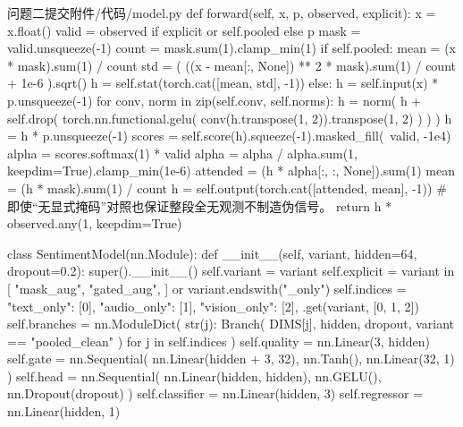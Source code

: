 \begin{appendices}
\begin{Python}{问题二提交附件/代码/model.py}
    def forward(self, x, p, observed, explicit):
        x = x.float()
        valid = observed if explicit or self.pooled else p
        mask = valid.unsqueeze(-1)
        count = mask.sum(1).clamp_min(1)
        if self.pooled:
            mean = (x * mask).sum(1) / count
            std = (
                ((x - mean[:, None]) ** 2 * mask).sum(1) / count + 1e-6
            ).sqrt()
            h = self.stat(torch.cat([mean, std], -1))
        else:
            h = self.input(x) * p.unsqueeze(-1)
            for conv, norm in zip(self.conv, self.norms):
                h = norm(
                    h
                    + self.drop(
                        torch.nn.functional.gelu(
                            conv(h.transpose(1, 2)).transpose(1, 2)
                        )
                    )
                )
                h = h * p.unsqueeze(-1)
            scores = self.score(h).squeeze(-1).masked_fill(~valid, -1e4)
            alpha = scores.softmax(1) * valid
            alpha = alpha / alpha.sum(1, keepdim=True).clamp_min(1e-6)
            attended = (h * alpha[:, :, None]).sum(1)
            mean = (h * mask).sum(1) / count
            h = self.output(torch.cat([attended, mean], -1))
        # 即使“无显式掩码”对照也保证整段全无观测不制造伪信号。
        return h * observed.any(1, keepdim=True)


class SentimentModel(nn.Module):
    def __init__(self, variant, hidden=64, dropout=0.2):
        super().__init__()
        self.variant = variant
        self.explicit = variant in [
            "mask_aug",
            "gated_aug",
        ] or variant.endswith("_only")
        self.indices = {
            "text_only": [0],
            "audio_only": [1],
            "vision_only": [2],
        }.get(variant, [0, 1, 2])
        self.branches = nn.ModuleDict(
            {
                str(j): Branch(
                    DIMS[j], hidden, dropout, variant == "pooled_clean"
                )
                for j in self.indices
            }
        )
        self.quality = nn.Linear(3, hidden)
        self.gate = nn.Sequential(
            nn.Linear(hidden + 3, 32), nn.Tanh(), nn.Linear(32, 1)
        )
        self.head = nn.Sequential(
            nn.Linear(hidden, hidden), nn.GELU(), nn.Dropout(dropout)
        )
        self.classifier = nn.Linear(hidden, 3)
        self.regressor = nn.Linear(hidden, 1)


\end{Python}
\end{appendices}
